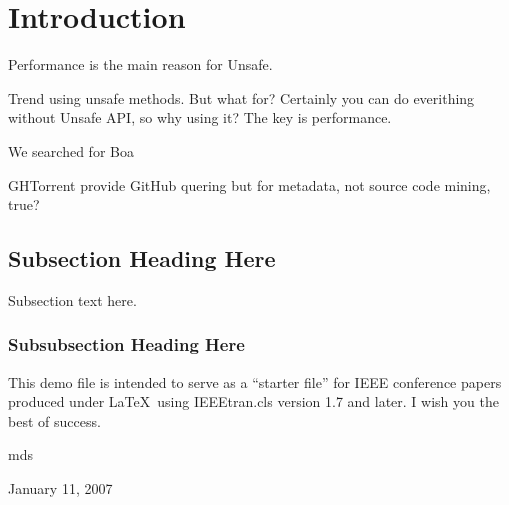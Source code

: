 
\section{Introduction} \label{sec:introduction}

Performance is the main reason for Unsafe.

Trend using unsafe methods. But what for? Certainly you can do everithing without Unsafe API, so why using it? The key is performance.

We searched for Boa \cite{Dyer-Nguyen-Rajan-Nguyen-13}


GHTorrent \cite{Gousi13} provide GitHub quering but for metadata, not source code mining, true?


\subsection{Subsection Heading Here}
Subsection text here.


\subsubsection{Subsubsection Heading Here}

%


This demo file is intended to serve as a ``starter file''
for IEEE conference papers produced under \LaTeX\ using
IEEEtran.cls version 1.7 and later.
I wish you the best of success.

\hfill mds

\hfill January 11, 2007
